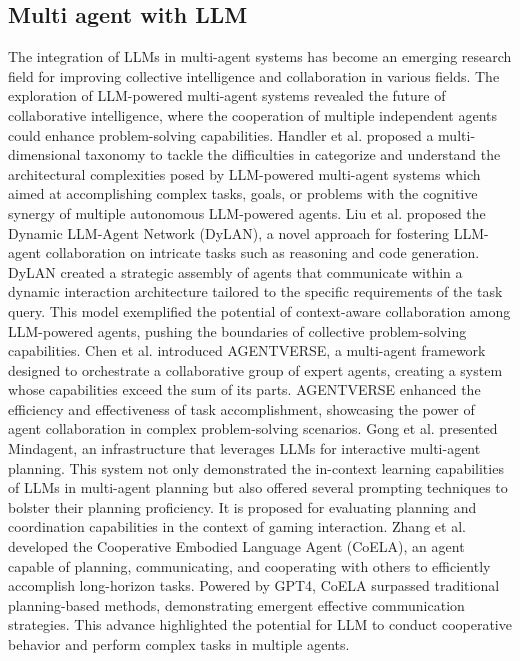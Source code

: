 \documentclass[lettersize,journal]{IEEEtran}
\begin{document}
\subsection{Multi agent with LLM}

The integration of LLMs in multi-agent systems has become an emerging research field for improving collective intelligence and collaboration in various fields. The exploration of LLM-powered multi-agent systems revealed the future of collaborative intelligence, where the cooperation of multiple independent agents could enhance problem-solving capabilities.
Handler et al. proposed a multi-dimensional taxonomy to tackle the difficulties in categorize and understand the architectural complexities posed by LLM-powered multi-agent systems which aimed at accomplishing complex tasks, goals, or problems with the cognitive synergy of multiple autonomous LLM-powered agents\cite{handler2023balancing}.
Liu et al. proposed the Dynamic LLM-Agent Network (DyLAN), a novel approach for fostering LLM-agent collaboration on intricate tasks such as reasoning and code generation. DyLAN created a strategic assembly of agents that communicate within a dynamic interaction architecture tailored to the specific requirements of the task query\cite{liu2023dynamic}. This model exemplified the potential of context-aware collaboration among LLM-powered agents, pushing the boundaries of collective problem-solving capabilities.
Chen et al. introduced AGENTVERSE, a multi-agent framework designed to orchestrate a collaborative group of expert agents, creating a system whose capabilities exceed the sum of its parts. AGENTVERSE enhanced the efficiency and effectiveness of task accomplishment, showcasing the power of agent collaboration in complex problem-solving scenarios\cite{chen2023agentverse}.
Gong et al. presented Mindagent, an infrastructure that leverages LLMs for interactive multi-agent planning. This system not only demonstrated the in-context learning capabilities of LLMs in multi-agent planning but also offered several prompting techniques to bolster their planning proficiency. It is proposed for evaluating planning and coordination capabilities in the context of gaming interaction\cite{gong2024mindagent}.
Zhang et al. developed the Cooperative Embodied Language Agent (CoELA), an agent capable of planning, communicating, and cooperating with others to efficiently accomplish long-horizon tasks. Powered by GPT4, CoELA surpassed traditional planning-based methods, demonstrating emergent effective communication strategies. This advance highlighted the potential for LLM to conduct cooperative behavior and perform complex tasks in multiple agents\cite{zhangbuilding}.
\end{document}
